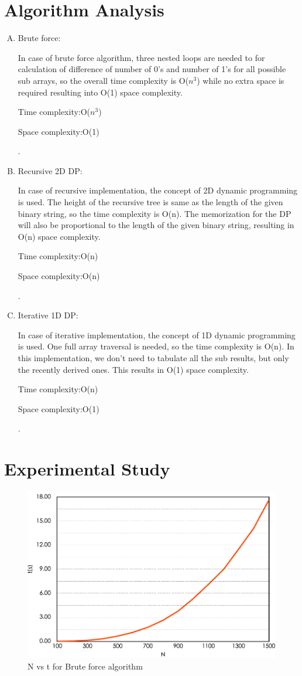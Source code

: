 \documentclass[conference]{IEEEtran}
\begin{document}
{\section{Algorithm Analysis}
\label{algoanalysis}

\begin{enumerate}[A)]
 
 \item
Brute force:

In case of brute force algorithm, three nested loops are needed to for calculation of difference of number of 0's and number of 1's for all possible sub arrays, so the overall time complexity is O($n^3$) while no extra space is required resulting into O(1) space complexity.

\centerline{Time complexity:O($n^3$)}
\centerline{Space complexity:O(1)}.

\item 
Recursive 2D DP:

In case of recursive implementation, the concept of 2D dynamic programming is used. The height of the recursive tree is same as the length of the given binary string, so the time complexity is O(n). The memorization for the DP will also be proportional to the length of the given binary string, resulting in O(n) space complexity.

\centerline{Time complexity:O(n)}
\centerline{Space complexity:O(n)}.
\item 
Iterative 1D DP:

In case of iterative implementation, the concept of 1D dynamic programming is used. One full array traversal is needed, so the time complexity is O(n). In this implementation, we don't need to tabulate all the sub results, but only the recently derived ones. This results in O(1) space complexity.

\centerline{Time complexity:O(n)}
\centerline{Space complexity:O(1)}.
\end{enumerate}


\section{Experimental Study}
\label{expstudy}
\begin{figure}[ht]
\includegraphics[scale=0.6]{Brute Force.pdf}
\caption{N vs t for Brute force algorithm}
\end{figure}


}
\end{document}
